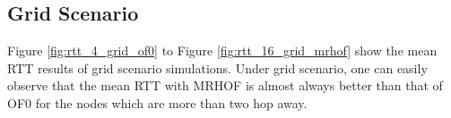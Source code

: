 \subsection{Grid Scenario}
\label{rtt:grid}
Figure \ref{fig:rtt_4_grid_of0} to Figure \ref{fig:rtt_16_grid_mrhof} show the mean RTT results of grid scenario simulations. Under grid scenario, one can easily observe that the mean RTT with MRHOF is almost always better than that of OF0 for the nodes which are more than two hop away. 
\begin{figure}[htbp]
  \centering
    \leavevmode

\end{figure}

